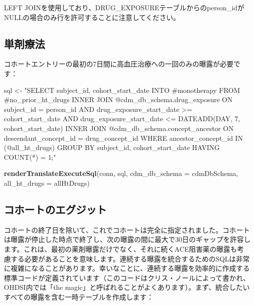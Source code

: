 \documentclass[
  11pt]{book}
\newenvironment{Shaded}{\begin{snugshade}}{\end{snugshade}}
\newcommand{\AttributeTok}[1]{\textcolor[rgb]{0.13,0.29,0.53}{#1}}
\newcommand{\FunctionTok}[1]{\textcolor[rgb]{0.13,0.29,0.53}{\textbf{#1}}}
\newcommand{\NormalTok}[1]{#1}
\newcommand{\OtherTok}[1]{\textcolor[rgb]{0.56,0.35,0.01}{#1}}
\newcommand{\StringTok}[1]{\textcolor[rgb]{0.31,0.60,0.02}{#1}}
\theoremstyle{definition}
\theoremstyle{definition}
\theoremstyle{definition}
\theoremstyle{definition}
\theoremstyle{remark}
\begin{document}
LEFT JOINを使用しており、DRUG\_EXPOSUREテーブルからのperson\_idがNULLの場合のみ行を許可することに注意してください。

\subsection{単剤療法}\label{ux5358ux5264ux7642ux6cd5}

コホートエントリーの最初の7日間に高血圧治療への一回のみの曝露が必要です：

\begin{Shaded}
\begin{Highlighting}[]
\NormalTok{sql }\OtherTok{\textless{}{-}} \StringTok{"SELECT subject\_id,}
\StringTok{  cohort\_start\_date}
\StringTok{INTO \#monotherapy}
\StringTok{FROM \#no\_prior\_ht\_drugs}
\StringTok{INNER JOIN @cdm\_db\_schema.drug\_exposure}
\StringTok{  ON subject\_id = person\_id}
\StringTok{    AND drug\_exposure\_start\_date \textgreater{}= cohort\_start\_date}
\StringTok{    AND drug\_exposure\_start\_date \textless{}= DATEADD(DAY, 7, cohort\_start\_date)}
\StringTok{INNER JOIN @cdm\_db\_schema.concept\_ancestor}
\StringTok{  ON descendant\_concept\_id = drug\_concept\_id}
\StringTok{WHERE ancestor\_concept\_id IN (@all\_ht\_drugs)}
\StringTok{GROUP BY subject\_id,}
\StringTok{  cohort\_start\_date}
\StringTok{HAVING COUNT(*) = 1;"}

\FunctionTok{renderTranslateExecuteSql}\NormalTok{(conn,}
\NormalTok{                          sql,}
                          \AttributeTok{cdm\_db\_schema =}\NormalTok{ cdmDbSchema,}
                          \AttributeTok{all\_ht\_drugs =}\NormalTok{ allHtDrugs)}
\end{Highlighting}
\end{Shaded}

\subsection{コホートのエグジット}\label{ux30b3ux30dbux30fcux30c8ux306eux30a8ux30b0ux30b8ux30c3ux30c8}

コホートの終了日を除いて、これでコホートは完全に指定されました。コホートは曝露が停止した時点で終了し、次の曝露の間に最大で30日のギャップを許容します。これは、最初の薬剤曝露だけでなく、それに続くACE阻害薬の曝露も考慮する必要があることを意味します。連続する曝露を統合するためのSQLは非常に複雑になることがあります。幸いなことに、連続する曝露を効率的に作成する標準コードが定義されています（このコードはクリス・ノールによって書かれ、OHDSI内では「the magic」と呼ばれることがよくあります）。まず、統合したいすべての曝露を含む一時テーブルを作成します：
\end{document}
